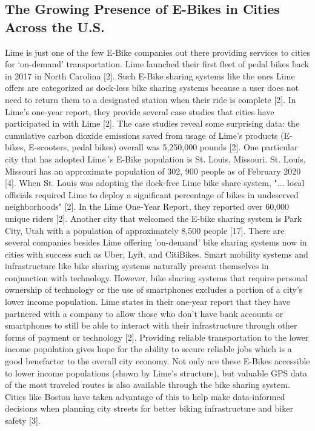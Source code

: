 \documentclass[letterpaper, 12 pt, conference]{ieeeconf}  %
\begin{document}
\subsection{The Growing Presence of E-Bikes in Cities Across the U.S.}
	Lime is just one of the few E-Bike companies out there providing services to cities for ‘on-demand’ transportation. Lime launched their first fleet of pedal bikes back in 2017 in North Carolina [2]. Such E-Bike sharing systems like the ones Lime offers are categorized as dock-less bike sharing systems because a user does not need to return them to a designated station when their ride is complete [2]. In Lime’s one-year report, they provide several case studies that cities have participated in with Lime [2]. The case studies reveal some surprising data: the cumulative carbon dioxide emissions saved from usage of Lime's products (E-bikes, E-scooters, pedal bikes) overall was 5,250,000 pounds [2]. One particular city that has adopted Lime´s E-Bike population is St. Louis, Missouri. St. Louis, Missouri has an approximate population of 302, 900 people as of February 2020 [4]. When St. Louis was adopting the dock-free Lime bike share system, "... local officials required Lime to deploy a significant percentage of bikes in undeserved neighborhoods" [2]. In the Lime One-Year Report, they reported over 60,000 unique riders [2]. Another city that welcomed the E-bike sharing system is Park City, Utah with a population of approximately 8,500 people [17]. 
	\newline
	There are several companies besides Lime offering 'on-demand' bike sharing systems now in cities with success such as Uber, Lyft, and CitiBikes. Smart mobility systems and infrastructure like bike sharing systems naturally present themselves in conjunction with technology. However, bike sharing systems that require personal ownership of technology or the use of smartphones excludes a portion of a city's lower income population. Lime states in their one-year report that they have partnered with a company to allow those who don’t have bank accounts or smartphones to still be able to interact with their infrastructure through other forms of payment or technology [2]. Providing reliable transportation to the lower income population gives hope for the ability to secure reliable jobs which is a good benefactor to the overall city economy. 
	\newline
	Not only are these E-Bikes accessible to lower income populations (shown by Lime's structure), but valuable GPS data of the most traveled routes is also available through the bike sharing system. Cities like Boston have taken advantage of this to help make data-informed decisions when planning city streets for better biking infrastructure and biker safety [3]. 
\end{document}
